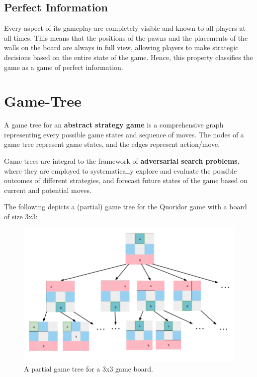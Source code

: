 \subsection{Perfect Information}
Every aspect of its gameplay are completely visible and known to all players at all times. This means that the positions of the pawns and the placements of the walls on the board are always in full view, allowing players to make strategic decisions based on the entire state of the game. Hence, this property classifies the game as a game of perfect information.

\section{Game-Tree}

A game tree for an \textbf{abstract strategy game} is a comprehensive graph representing every possible game states and sequence of moves. The nodes of a game tree represent game states, and the
edges represent action/move.

Game trees are integral to the framework of \textbf{adversarial search problems}, where they are employed to systematically explore and evaluate the possible outcomes of different strategies, and forecast future states of the game based on current and potential moves.

The following depicts a (partial) game tree for the Quoridor game with a board of size 3x3:

\begin{figure}[!ht]
    \centering
    \includegraphics[scale=0.45]{../img/GameBoard/game_tree.png}
    \caption{A partial game tree for a 3x3 game board.}
    \label{fig:GameTree}
\end{figure}


